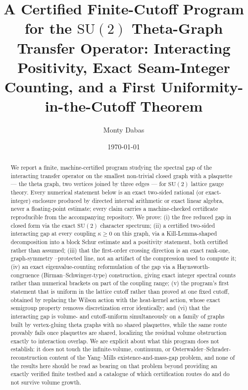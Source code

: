 \documentclass[aps,prd,twocolumn,superscriptaddress,nofootinbib]{revtex4-2}
\newcommand{\SU}{\mathrm{SU}(2)}
\begin{document}
\title{A Certified Finite-Cutoff Program for the $\SU$ Theta-Graph
Transfer Operator: Interacting Positivity, Exact Seam-Integer Counting,
and a First Uniformity-in-the-Cutoff Theorem}

\author{Monty Dabas}

\date{\today}

\begin{abstract}
We report a finite, machine-certified program studying the spectral gap of
the interacting transfer operator on the smallest non-trivial closed graph
with a plaquette --- the theta graph, two vertices joined by three edges
--- for $\SU$ lattice gauge theory. Every numerical statement below is an
exact two-sided rational (or exact-integer) enclosure produced by directed
interval arithmetic or exact linear algebra, never a floating-point
estimate; every claim carries a machine-checked certificate reproducible
from the accompanying repository. We prove: (i) the free reduced gap in
closed form via the exact $\SU$ character spectrum; (ii) a certified
two-sided interacting gap at every coupling $\kappa \geq 0$ on this graph,
via a Kill-Lemma-shaped decomposition into a block Schur estimate and a
positivity statement, both certified rather than assumed; (iii) that the
first-order crossing direction is an exact rank-one, graph-symmetry
--protected line, not an artifact of the compression used to compute it;
(iv) an exact eigenvalue-counting reformulation of the gap via a
Haynsworth-congruence (Birman--Schwinger-type) construction, giving exact
integer spectral counts rather than numerical brackets on part of the
coupling range; (v) the program's first statement that is uniform in the
lattice cutoff rather than proved at one fixed cutoff, obtained by
replacing the Wilson action with the heat-kernel action, whose exact
semigroup property removes discretization error identically; and (vi) that
the interacting gap is volume- and cutoff-uniform simultaneously on a
family of graphs built by vertex-gluing theta graphs with no shared
plaquettes, while the same route provably fails once plaquettes are
shared, localizing the residual volume obstruction exactly to
interaction overlap. We are explicit about what this program does not
establish: it does not touch the infinite-volume, continuum, or
Osterwalder--Schrader-reconstruction content of the Yang--Mills
existence-and-mass-gap problem, and none of the results here should be
read as bearing on that problem beyond providing an exactly verified
finite testbed and a catalogue of which certification routes do and do
not survive volume growth.
\end{abstract}
\end{document}
